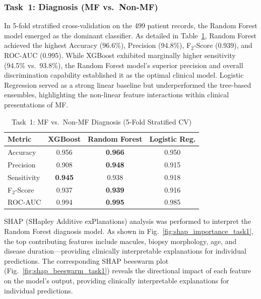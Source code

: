 \documentclass[conference]{IEEEtran}
\begin{document}
\subsubsection{Task~1: Diagnosis (MF vs.\ Non-MF)}
In 5-fold stratified cross-validation on the 499 patient records, the Random Forest model emerged as the dominant classifier. As detailed in Table~\ref{tab:clinical_task1}, Random Forest achieved the highest Accuracy (96.6\%), Precision (94.8\%), F$_2$-Score (0.939), and ROC-AUC (0.995). While XGBoost exhibited marginally higher sensitivity (94.5\% vs.\ 93.8\%), the Random Forest model's superior precision and overall discrimination capability established it as the optimal clinical model. Logistic Regression served as a strong linear baseline but underperformed the tree-based ensembles, highlighting the non-linear feature interactions within clinical presentations of MF.

\begin{table}[htbp]
\caption{Task~1: MF vs.\ Non-MF Diagnosis (5-Fold Stratified CV)}
\label{tab:clinical_task1}
\centering
\renewcommand{\arraystretch}{1.1}
\setlength{\tabcolsep}{4pt}
\begin{tabular}{l c c c}
\toprule
\textbf{Metric} & \textbf{XGBoost} & \textbf{Random Forest} & \textbf{Logistic Reg.} \\
\midrule
Accuracy    & 0.956              & \textbf{0.966}          & 0.950 \\
Precision   & 0.908              & \textbf{0.948}          & 0.915 \\
Sensitivity & \textbf{0.945}     & 0.938                   & 0.918 \\
F$_2$-Score & 0.937              & \textbf{0.939}          & 0.916 \\
ROC-AUC     & 0.994              & \textbf{0.995}          & 0.985 \\
\bottomrule
\end{tabular}
\end{table}

SHAP (SHapley Additive exPlanations) analysis was performed to interpret the 
Random Forest diagnosis model. As shown in Fig.~\ref{fig:shap_importance_task1}, 
the top contributing features include macules, biopsy morphology, age, and disease 
duration—providing clinically interpretable explanations for individual predictions.
The corresponding SHAP beeswarm plot (Fig.~\ref{fig:shap_beeswarm_task1}) reveals 
the directional impact of each feature on the model's output, providing clinically 
interpretable explanations for individual predictions.
\end{document}
